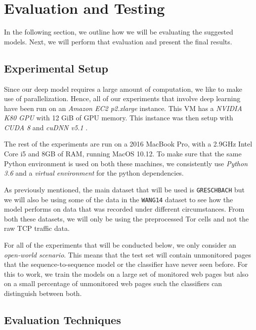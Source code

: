 

\chapter{Evaluation and Testing}

In the following section, we outline how we will be evaluating the suggested models.
Next, we will perform that evaluation and present the final results.

\section{Experimental Setup}

Since our deep model requires a large amount of computation, we like to make use of parallelization.
Hence, all of our experiments that involve deep learning have been run on an \textit{Amazon EC2 p2.xlarge} instance.
This VM has a \textit{NVIDIA K80 GPU} with 12 GiB of GPU memory.
This instance was then setup with \textit{CUDA 8} and \textit{cuDNN v5.1} \cite{tensorflow,nvidia_developer_2017}.

The rest of the experiments are run on a 2016 MacBook Pro, with a 2.9GHz Intel Core i5 and 8GB of RAM, running MacOS 10.12.
To make sure that the same Python environment is used on both these machines, we consistently use \textit{Python 3.6} and a \textit{virtual environment} for the python dependencies.

As previously mentioned, the main dataset that will be used is \texttt{GRESCHBACH} but we will also be using some of the data in the \texttt{WANG14} dataset to see how the model performs on data that was recorded under different circumstances.
From both these datasets, we will only be using the preprocessed Tor cells and not the raw TCP traffic data.

For all of the experiments that will be conducted below, we only consider an \textit{open-world scenario}.
This means that the test set will contain unmonitored pages that the sequence-to-sequence model or the classifier have never seen before.
For this to work, we train the models on a large set of monitored web pages but also on a small percentage of unmonitored web pages such the classifiers can distinguish between both.

\section{Evaluation Techniques}

